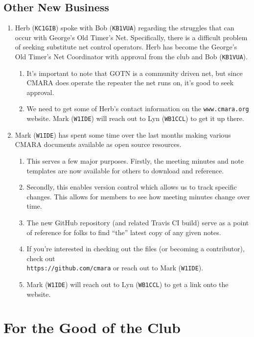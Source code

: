 \documentclass[10pt,letterpaper]{article}
\begin{document}
\subsection{Other New Business}
\begin{enumerate}
  \item Herb (\texttt{KC1GIB}) spoke with Bob (\texttt{KB1VUA}) regarding the struggles that can occur with George's Old Timer's Net. Specifically, there is a difficult problem of seeking substitute net control operators. Herb has become the George's Old Timer's Net Coordinator with approval from the club and Bob (\texttt{KB1VUA}).
  \begin{enumerate}
    \item It's important to note that GOTN is a community driven net, but since CMARA does operate the repeater the net runs on, it's good to seek approval.
    \item We need to get some of Herb's contact information on the \texttt{www.cmara.org} website. Mark (\texttt{W1IDE}) will reach out to Lyn (\texttt{WB1CCL}) to get it up there.
  \end{enumerate}
  \item Mark (\texttt{W1IDE}) has spent some time over the last months making various CMARA documents available as open source resources.
  \begin{enumerate}
    \item This serves a few major purposes. Firstly, the meeting minutes and note templates are now available for others to download and reference.
    \item Secondly, this enables version control which allows us to track specific changes. This allows for members to see how meeting minutes change over time.
    \item The new GitHub repository (and related Travis CI build) serve as a point of reference for folks to find ``the'' latest copy of any given notes.
    \item If you're interested in checking out the files (or becoming a contributor), check out\\ \texttt{https://github.com/cmara} or reach out to Mark (\texttt{W1IDE}).
    \item Mark (\texttt{W1IDE}) will reach out to Lyn (\texttt{WB1CCL}) to get a link onto the website.
  \end{enumerate}
\end{enumerate}

\section{For the Good of the Club}
\end{document}

